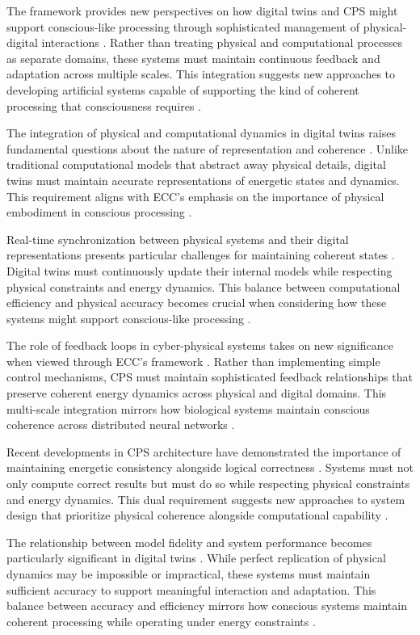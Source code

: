 The framework provides new perspectives on how digital twins and CPS might support conscious-like processing through sophisticated management of physical-digital interactions \cite{Wang2019}. Rather than treating physical and computational processes as separate domains, these systems must maintain continuous feedback and adaptation across multiple scales. This integration suggests new approaches to developing artificial systems capable of supporting the kind of coherent processing that consciousness requires \cite{White2021}.

The integration of physical and computational dynamics in digital twins raises fundamental questions about the nature of representation and coherence \cite{Fuller2020}. Unlike traditional computational models that abstract away physical details, digital twins must maintain accurate representations of energetic states and dynamics. This requirement aligns with ECC's emphasis on the importance of physical embodiment in conscious processing \cite{Jones2020}.

Real-time synchronization between physical systems and their digital representations presents particular challenges for maintaining coherent states \cite{Madni2019}. Digital twins must continuously update their internal models while respecting physical constraints and energy dynamics. This balance between computational efficiency and physical accuracy becomes crucial when considering how these systems might support conscious-like processing \cite{Minerva2020}.

The role of feedback loops in cyber-physical systems takes on new significance when viewed through ECC's framework \cite{Lee2018}. Rather than implementing simple control mechanisms, CPS must maintain sophisticated feedback relationships that preserve coherent energy dynamics across physical and digital domains. This multi-scale integration mirrors how biological systems maintain conscious coherence across distributed neural networks \cite{Rajkumar2018}.

Recent developments in CPS architecture have demonstrated the importance of maintaining energetic consistency alongside logical correctness \cite{Grieves2021}. Systems must not only compute correct results but must do so while respecting physical constraints and energy dynamics. This dual requirement suggests new approaches to system design that prioritize physical coherence alongside computational capability \cite{Liu2021}.

The relationship between model fidelity and system performance becomes particularly significant in digital twins \cite{Tao2019}. While perfect replication of physical dynamics may be impossible or impractical, these systems must maintain sufficient accuracy to support meaningful interaction and adaptation. This balance between accuracy and efficiency mirrors how conscious systems maintain coherent processing while operating under energy constraints \cite{Uhlemann2017}.

